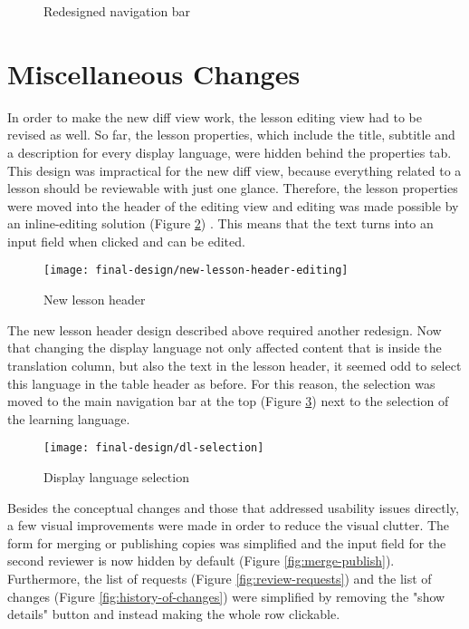 \begin{figure}[h!]
 \centering
 \caption{Redesigned navigation bar}
 \label{fig:redesigned-nav}
\end{figure}

\section{Miscellaneous Changes}
In order to make the new diff view work, the lesson editing view had to be revised as well. So far, the lesson properties, which include the title, subtitle and a description for every display language, were hidden behind the properties tab. This design was impractical for the new diff view, because everything related to a lesson should be reviewable with just one glance. Therefore, the lesson properties were moved into the header of the editing view and editing was made possible by an inline-editing solution (Figure \ref{fig:new-lesson-header}) \cite{_inplace_????}. This means that the text turns into an input field when clicked and can be edited.

\begin{figure}[h!]
 \centering
 \texttt{[image: final-design/new-lesson-header-editing]}
 \caption{New lesson header}
 \label{fig:new-lesson-header}
\end{figure}

The new lesson header design described above required another redesign. Now that changing the display language not only affected content that is inside the translation column, but also the text in the lesson header, it seemed odd to select this language in the table header as before. For this reason, the selection was moved to the main navigation bar at the top (Figure \ref{fig:dl-selection}) next to the selection of the learning language.

\begin{figure}[h!]
 \centering
 \texttt{[image: final-design/dl-selection]}
 \caption{Display language selection}
 \label{fig:dl-selection}
\end{figure}

Besides the conceptual changes and those that addressed usability issues directly, a few visual improvements were made in order to reduce the visual clutter. The form for merging or publishing copies was simplified and the input field for the second reviewer is now hidden by default (Figure \ref{fig:merge-publish}). Furthermore, the list of requests (Figure \ref{fig:review-requests}) and the list of changes (Figure \ref{fig:history-of-changes}) were simplified by removing the "show details" button and instead making the whole row clickable.

